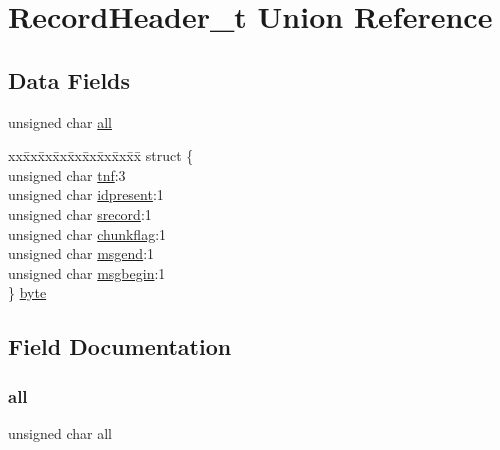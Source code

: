 \hypertarget{union_record_header__t}{}\section{Record\+Header\+\_\+t Union Reference}
\label{union_record_header__t}
\subsection*{Data Fields}
\begin{DoxyCompactItemize}
\item 
unsigned char \mbox{\hyperlink{union_record_header__t_a0d1e2c9bec519d8f9faf53f732af2ef0}{all}}
\item 
\begin{tabbing}
xx\=xx\=xx\=xx\=xx\=xx\=xx\=xx\=xx\=\kill
struct \{\\
\>unsigned char \mbox{\hyperlink{union_record_header__t_ad725e8d4364cd9dd0b30d3e78efd1cf6}{tnf}}:3\\
\>unsigned char \mbox{\hyperlink{union_record_header__t_a986bb7684f9a4456350fb2f140d14a11}{idpresent}}:1\\
\>unsigned char \mbox{\hyperlink{union_record_header__t_a17ee86011122945c7daa15b3bbbbe7d1}{srecord}}:1\\
\>unsigned char \mbox{\hyperlink{union_record_header__t_a0603902f88dd571aa0888ec0e826bc46}{chunkflag}}:1\\
\>unsigned char \mbox{\hyperlink{union_record_header__t_a20659068f23b2466db0628398fc12595}{msgend}}:1\\
\>unsigned char \mbox{\hyperlink{union_record_header__t_ab90540d5e108e6195df15e3fad8559bb}{msgbegin}}:1\\
\} \mbox{\hyperlink{union_record_header__t_a6c9a2f6fba6021fa942de37fdfd3027f}{byte}}\\

\end{tabbing}\end{DoxyCompactItemize}


\subsection{Field Documentation}
\mbox{\label{union_record_header__t_a0d1e2c9bec519d8f9faf53f732af2ef0}} 
\subsubsection{\texorpdfstring{all}{all}}
{\footnotesize\ttfamily unsigned char all}

